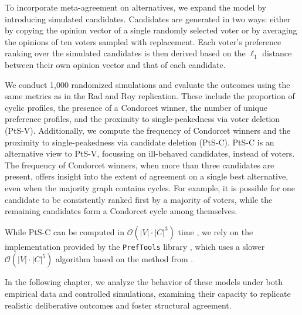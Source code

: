 To incorporate meta-agreement on alternatives, we expand the model by
introducing simulated candidates. Candidates are generated in two ways: either
by copying the opinion vector of a single randomly selected voter or by
averaging the opinions of ten voters sampled with replacement. Each voter's
preference ranking over the simulated candidates is then derived based on the
$\ell_1$ distance between their own opinion vector and that of each candidate.

We conduct 1,000 randomized simulations and evaluate the outcomes using the
same metrics as in the Rad and Roy replication. These include the proportion of
cyclic profiles, the presence of a Condorcet winner, the number of unique
preference profiles, and the proximity to single-peakedness via voter deletion
(PtS-V). Additionally, we compute the frequency of Condorcet winners and the
proximity to single-peakedness via candidate deletion (PtS-C). PtS-C is an
alternative view to PtS-V, focussing on ill-behaved candidates, instead of
voters. The frequency of Condorcet winners, when more than three candidates are
present, offers insight into the extent of agreement on a single best
alternative, even when the majority graph contains cycles. For example, it is
possible for one candidate to be consistently ranked first by a majority of
voters, while the remaining candidates form a Condorcet cycle among themselves.

While PtS-C can be computed in $\mathcal{O}(|V| \cdot |C|^3)$ time
\cite{przedmojskiAlgorithmsExperimentsNearly2016}, we rely on the implementation
provided by the \texttt{PrefTools} library \cite{PrefLibPreflibtools2025},
which uses a slower $\mathcal{O}(|V| \cdot |C|^5)$ algorithm based on the
method from \citet{erdelyiComputationalAspectsNearly2013}.

In the following chapter, we analyze the behavior of these models under both
empirical data and controlled simulations, examining their capacity to
replicate realistic deliberative outcomes and foster structural agreement.

